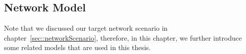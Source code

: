 \subsection{Network Model}
\label{sec::dataModel}
Note that we discussed our target network scenario in chapter~\ref{sec::networkScenario}, therefore, in this chapter, we further introduce some related models that are used in this thesis.
%
%
